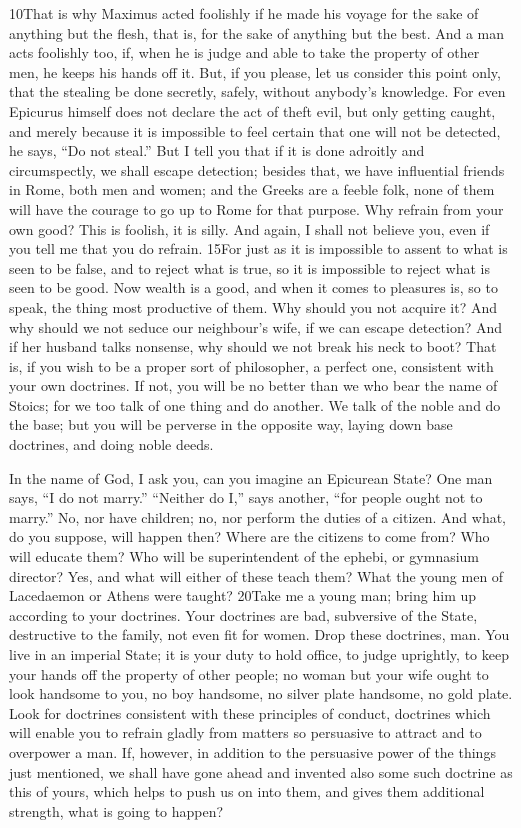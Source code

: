 10That is why Maximus acted foolishly if he made his voyage for the sake of anything but the flesh, that is, for the sake of anything but the best. And a man acts foolishly too, if, when he is judge and able to take the property of other men, he keeps his hands off it. But, if you please, let us consider this point only, that the stealing be done secretly, safely, without anybody's knowledge. For even Epicurus himself does not declare the act of theft evil, but only getting caught, and merely because it is impossible to feel certain that one will not be detected, he says, ``Do not steal.'' But I tell you that if it is done adroitly and circumspectly, we shall escape detection; besides that, we have influential friends in Rome, both men and women; and the Greeks are a feeble folk, none of them will have the courage to go up to Rome for that purpose. Why refrain from your own good? This is foolish, it is silly. And again, I shall not believe you, even if you tell me that you do refrain. 15For just as it is impossible to assent to what is seen to be false, and to reject what is true, so it is impossible to reject what is seen to be good. Now wealth is a good, and when it comes to pleasures is, so to speak, the thing most productive of them. Why should you not acquire it? And why should we not seduce our neighbour's wife, if we can escape detection? And if her husband talks nonsense, why should we not break his neck to boot? That is, if you wish to be a proper sort of philosopher, a perfect one, consistent with your own doctrines. If not, you will be no better than we who bear the name of Stoics; for we too talk of one thing and do another. We talk of the noble and do the base; but you will be perverse in the opposite way, laying down base doctrines, and doing noble deeds.

In the name of God, I ask you, can you imagine an Epicurean State? One man says, ``I do not marry.'' ``Neither do I,'' says another, ``for people ought not to marry.'' No, nor have children; no, nor perform the duties of a citizen. And what, do you suppose, will happen then? Where are the citizens to come from? Who will educate them? Who will be superintendent of the ephebi, or gymnasium director? Yes, and what will either of these teach them? What the young men of Lacedaemon or Athens were taught? 20Take me a young man; bring him up according to your doctrines. Your doctrines are bad, subversive of the State, destructive to the family, not even fit for women. Drop these doctrines, man. You live in an imperial State; it is your duty to hold office, to judge uprightly, to keep your hands off the property of other people; no woman but your wife ought to look handsome to you, no boy handsome, no silver plate handsome, no gold plate. Look for doctrines consistent with these principles of conduct, doctrines which will enable you to refrain gladly from matters so persuasive to attract and to overpower a man. If, however, in addition to the persuasive power of the things just mentioned, we shall have gone ahead and invented also some such doctrine as this of yours, which helps to push us on into them, and gives them additional strength, what is going to happen?

